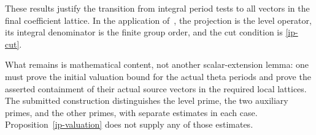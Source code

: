 These results justify the transition from integral period tests
to all vectors in the final coefficient lattice.  In the application
of~\cite{alpo-uniform-source}, the projection is the level operator,
its integral denominator is the finite group order, and the cut
condition is \eqref{ip-cut}.

What remains is mathematical content, not another scalar-extension
lemma: one must prove the initial valuation bound for the actual
theta periods and prove the asserted containment of their actual
source vectors in the required local lattices. The submitted
construction distinguishes the level prime, the two auxiliary
primes, and the other primes, with separate estimates in each case.
Proposition~\ref{ip-valuation} does not supply any of those estimates.


